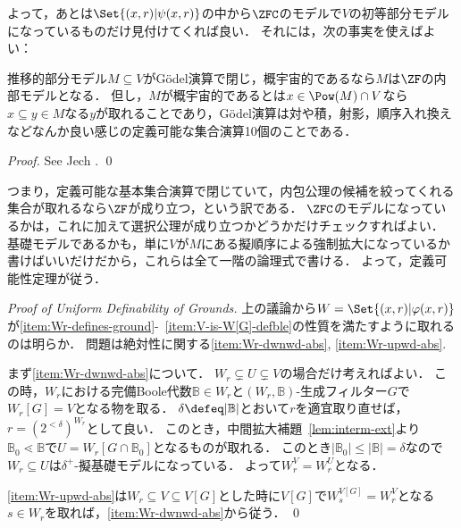\documentclass[a4j,leqno]{ltjsarticle}
\newcommand{\gM}{g\mathbb{M}}
\theoremstyle{nonumberplain}
\begin{document}
よって，あとは$\Set{(x, r) | \psi(x, r)}$の中から$\ZFC$のモデルで$V$の初等部分モデルになっているものだけ見付けてくれば良い．
それには，次の事実を使えばよい：
\begin{fact}
 推移的部分モデル$M \subseteq V$がG\"{o}del演算で閉じ，概宇宙的であるなら$M$は$\ZF$の内部モデルとなる．
 但し，$M$が概宇宙的であるとは$x \in \Pow(M) \cap V$なら$x \subseteq y \in M$なる$y$が取れることであり，G\"{o}del演算は対や積，射影，順序入れ換えなどなんか良い感じの定義可能な集合演算10個のことである．
\end{fact}
\begin{proof}
 See Jech \cite[Theorem 13.9]{Jech:2002}. \qed
\end{proof}
つまり，定義可能な基本集合演算で閉じていて，内包公理の候補を絞ってくれる集合が取れるなら$\ZF$が成り立つ，という訳である．
$\ZFC$のモデルになっているかは，これに加えて選択公理が成り立つかどうかだけチェックすればよい．
基礎モデルであるかも，単に$V$が$M$にある擬順序による強制拡大になっているか書けばいいだけだから，これらは全て一階の論理式で書ける．
よって，定義可能性定理が従う．
\begin{proof}[Proof of Uniform Definability of Grounds]
 上の議論から$W = \Set{ (x, r) | \varphi(x, r)}$が\ref{item:Wr-defines-ground}-~\ref{item:V-is-W[G]-defble}の性質を満たすように取れるのは明らか．
 問題は絶対性に関する\ref{item:Wr-dwnwd-abs}, \ref{item:Wr-upwd-abs}.

 まず\ref{item:Wr-dwnwd-abs}について．
 $W_r \subsetneq U \subsetneq V$の場合だけ考えればよい．
 この時，$W_r$における完備Boole代数$\mathbb{B} \in W_r$と$(W_r, \mathbb{B})$-生成フィルター$G$で$W_r[G] = V$となる物を取る．
 $\delta \defeq |\mathbb{B}|$とおいて$r$を適宜取り直せば，$r = (2^{<\delta})^{W_r}$として良い．
 このとき，中間拡大補題~\ref{lem:interm-ext}より$\mathbb{B}_0 \lessdot \mathbb{B}$で$U = W_r[G \cap \mathbb{B}_0]$となるものが取れる．
 このとき$|\mathbb{B}_0| \leq |\mathbb{B}| = \delta$なので$W_r \subseteq U$は$\delta^+$-擬基礎モデルになっている．
 よって$W_r^V = W_r^U$となる．

 \ref{item:Wr-upwd-abs}は$W_r \subseteq V \subseteq V[G]$とした時に$V[G]$で$W_s^{V[G]} = W_r^V$となる$s \in W_r$を取れば，\ref{item:Wr-dwnwd-abs}から従う． \qed
\end{proof}


\nocite{Fuchs:2014fj,Usuba:2017fp,Reitz:2007af}
\printbibliography[title=参考文献]
\end{document}
